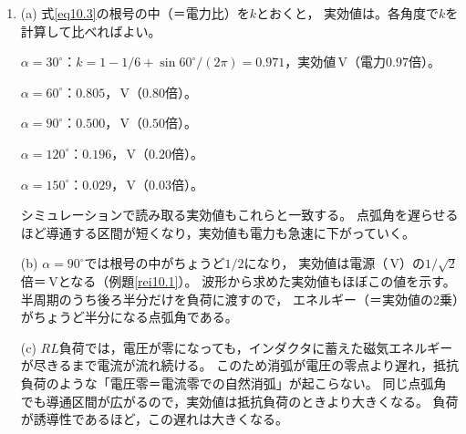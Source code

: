 \begin{enumerate}
\item[\ref{ex10.7}]

(a) 式\ref{eq10.3}の根号の中（＝電力比）を$k$とおくと，
実効値は。各角度で$k$を計算して比べればよい。

$\alpha = 30^\circ$：$k = 1 - 1/6 + \sin 60^\circ/(2\pi) = 0.971$，実効値\,V（電力$0.97$倍）。

$\alpha = 60^\circ$：$0.805$，\,V（$0.80$倍）。

$\alpha = 90^\circ$：$0.500$，\,V（$0.50$倍）。

$\alpha = 120^\circ$：$0.196$，\,V（$0.20$倍）。

$\alpha = 150^\circ$：$0.029$，\,V（$0.03$倍）。

シミュレーションで読み取る実効値もこれらと一致する。
点弧角を遅らせるほど導通する区間が短くなり，実効値も電力も急速に下がっていく。

(b) $\alpha = 90^\circ$では根号の中がちょうど$1/2$になり，
実効値は電源（\,V）の$1/\sqrt{2}$倍＝\,Vとなる（例題\ref{rei10.1}）。
波形から求めた実効値もほぼこの値を示す。
半周期のうち後ろ半分だけを負荷に渡すので，
エネルギー（＝実効値の2乗）がちょうど半分になる点弧角である。

(c) $RL$負荷では，電圧が零になっても，インダクタに蓄えた磁気エネルギーが尽きるまで電流が流れ続ける。
このため消弧が電圧の零点より遅れ，抵抗負荷のような「電圧零＝電流零での自然消弧」が起こらない。
同じ点弧角でも導通区間が広がるので，実効値は抵抗負荷のときより大きくなる。
負荷が誘導性であるほど，この遅れは大きくなる。
\end{enumerate}
